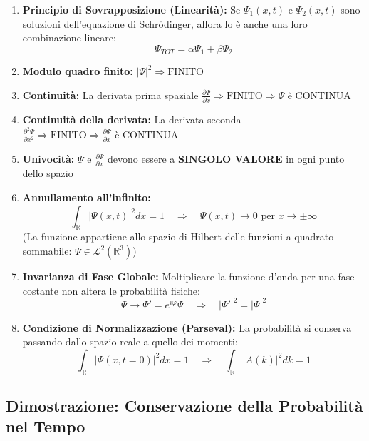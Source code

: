 \documentclass[11pt, a4paper]{article}
\begin{document}
\begin{enumerate}
    \item \textbf{Principio di Sovrapposizione (Linearità):} Se $\Psi_1(x,t)$ e $\Psi_2(x,t)$ sono soluzioni dell'equazione di Schrödinger, allora lo è anche una loro combinazione lineare: %
    \begin{equation*}
        \Psi_{TOT} = \alpha\Psi_1 + \beta\Psi_2 %
    \end{equation*}
    \item \textbf{Modulo quadro finito:} $|\Psi|^2 \Rightarrow \text{FINITO}$ %
    \item \textbf{Continuità:} La derivata prima spaziale $\frac{\partial \Psi}{\partial x} \Rightarrow \text{FINITO} \Rightarrow \Psi \text{ è CONTINUA}$ %
    \item \textbf{Continuità della derivata:} La derivata seconda $\frac{\partial^2 \Psi}{\partial x^2} \Rightarrow \text{FINITO} \Rightarrow \frac{\partial \Psi}{\partial x} \text{ è CONTINUA}$ %
    \item \textbf{Univocità:} $\Psi$ e $\frac{\partial \Psi}{\partial x}$ devono essere a \textbf{SINGOLO VALORE} in ogni punto dello spazio %
    \item \textbf{Annullamento all'infinito:} %
    \begin{equation*}
        \int_{\mathbb{R}} |\Psi(x,t)|^2 dx = 1 \quad \Rightarrow \quad \Psi(x,t) \to 0 \text{ per } x \to \pm\infty %
    \end{equation*}
    (La funzione appartiene allo spazio di Hilbert delle funzioni a quadrato sommabile: $\Psi \in \mathcal{L}^2(\mathbb{R}^3)$) %
    \item \textbf{Invarianza di Fase Globale:} Moltiplicare la funzione d'onda per una fase costante non altera le probabilità fisiche: %
    \begin{equation*}
        \Psi \to \Psi' = e^{i\varphi}\Psi \quad \Rightarrow \quad |\Psi'|^2 = |\Psi|^2 %
    \end{equation*}
    \item \textbf{Condizione di Normalizzazione (Parseval):} La probabilità si conserva passando dallo spazio reale a quello dei momenti: %
    \begin{equation*}
        \int_{\mathbb{R}} |\Psi(x,t=0)|^2 dx = 1 \quad \Rightarrow \quad \int_{\mathbb{R}} |A(k)|^2 dk = 1 %
    \end{equation*}
\end{enumerate}

\subsection{Dimostrazione: Conservazione della Probabilità nel Tempo} %
\end{document}
